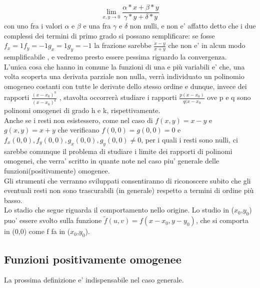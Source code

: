 \documentclass[fontsize = 20px, paper = a4]{article}
\begin{document}
$$\lim_{x,y \to 0}\frac{\alpha*x + \beta*y}{\gamma*y + \delta * y}$$
con uno fra i valori $\alpha$ e $\beta$ e una fra $\gamma$ e $\delta$ non nulli, e non e' affatto detto che i due complessi dei termini di primo grado si possano semplificare: se fosse $f_x = 1 f_y = -1 g_x = 1 g_y = -1$ la frazione sarebbe $\frac{x-y}{x+y}$ che non e' in alcun modo semplificabile , e vedremo presto essere pessima riguardo la convergenza.\\
L'unica cosa che hanno in comune la funzioni di una e più variabili e' che, una volta scoperta una derivata parziale non nulla, verrà individuato un polinomio omogeneo costanti con tutte le derivate dello stesso ordine e dunque, invece dei rapporti $\frac{(x-x_0)^h}{(x-x_0)^k}$ , stavolta occorrerà studiare i rapporti $\frac{p(x-x_0)}{q(x-x_0}$ ove p e q sono polinomi omogenei di grado h e k, rispettivamente.\\
Anche se i resti non esistessero, come nel caso di $f(x,y) = x - y$ e $g(x,y) = x+y$ che verificano $f(0,0) = g(0,0) = 0$ e $f_x(0,0),f_y(0,0),g_x(0,0),g_y(0,0) \neq 0$, per i quali i resti sono nulli, ci sarebbe comunque il problema di studiare i limite dei rapporti di polinomi omogenei, che verra' scritto in quante note nel caso piu' generale delle funzioni(positivamente) omogenee.\\
Gli strumenti che verranno sviluppati consentiranno di riconoscere subito che gli eventuali resti non sono trascurabili (in generale) respetto a termini di ordine più basso.\\
Lo stadio che segue riguarda il comportamento nello origine. Lo studio in ($x_0$,$y_0$) puo' essere svolto sulla funzione $\tilde{f}(u,v) = f(x-x_0, y-y_0)$, che si comporta in (0,0) come f fa in ($x_0$,$y_0$).
\subsection{Funzioni positivamente omogenee}
La prossima definizione e' indispensabile nel caso generale.
\end{document}
